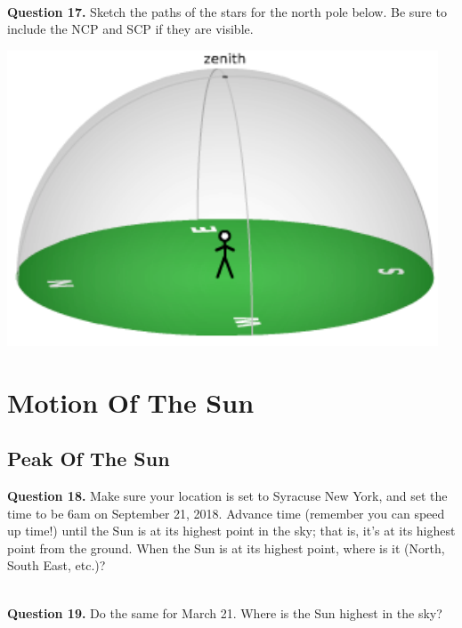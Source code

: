 \documentclass[11pt]{article}
\begin{document}
\hrulefill\\

\textbf{Question 17.} Sketch the paths of the stars for the north pole below. Be sure to include the NCP and SCP if they are visible. \\
\vspace*{1.5cm}

\begin{center}
	\includegraphics{local_sky}
\end{center}

\newpage

\section{Motion Of The Sun}

\subsection{Peak Of The Sun}

\textbf{Question 18.} Make sure your location is set to Syracuse New York, and set the time to be 6am on September 21, 2018. Advance time (remember you can speed up time!) until the Sun is at its highest point in the sky; that is, it's at its highest point from the ground. When the Sun is at its highest point, where is it (North, South East, etc.)?\\
\vspace*{1.5cm}

\hrulefill\\

\textbf{Question 19.} Do the same for March 21. Where is the Sun highest in the sky?\\
\vspace*{1.5cm}
\end{document}
